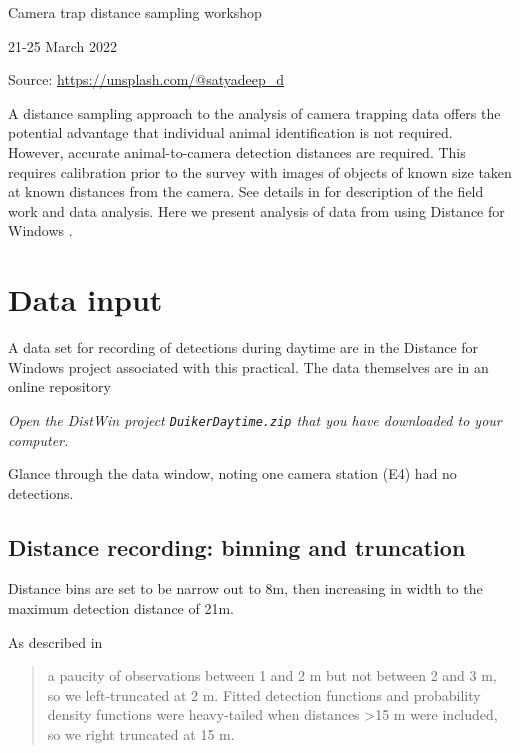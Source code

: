 \documentclass[a4paper]{article}
\begin{document}
\phantom{a}

\bigskip

{\Large Camera trap distance sampling workshop}

{\large 21-25 March 2022}

\begin{flushright}
\tiny{Source: \url{https://unsplash.com/@satyadeep_d}}
\end{flushright}

%
{%
}

A distance sampling approach to the analysis of camera trapping data offers the potential advantage that individual animal identification is not required. However, accurate animal-to-camera detection distances are required. This requires calibration prior to the survey with images of objects of known size taken at known distances from the camera. See details in \citep{howeetal} for description of the field work and data analysis. Here we present analysis of data from \citep{howeetal} using Distance for Windows \citep{Thomas2010}. 

\section{Data input}

A data set for recording of detections during daytime are in the Distance for Windows project associated with this practical.  The data themselves are in an online repository \citep{dryad}

\emph{Open the DistWin project \texttt{DuikerDaytime.zip} that you have downloaded to your computer.}

Glance through the data window, noting one camera station (E4) had no detections.

\subsection{Distance recording: binning and truncation}
Distance bins are set to be narrow out to 8m, then increasing in width to the maximum detection distance of 21m.

As described in \cite{howeetal}
\begin{quotation}
a paucity of observations between 1 and 2 m but not between 2 and 3 m, so we left-truncated at 2 m. Fitted detection functions and probability density functions were heavy-tailed when distances >15 m were included, so we right truncated at 15 m.
\end{quotation}
\end{document}
